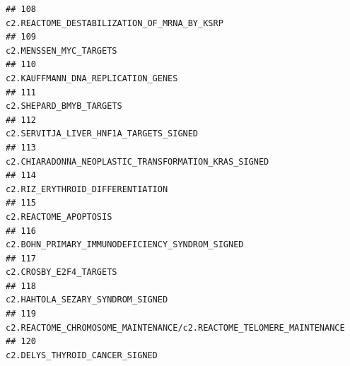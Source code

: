 \documentclass{article}\usepackage[]{graphicx}\usepackage[]{color}
\makeatletter
\newenvironment{kframe}{%
 \def\at@end@of@kframe{}%
 \ifinner\ifhmode%
  \def\at@end@of@kframe{\end{minipage}}%
  \begin{minipage}{\columnwidth}%
 \fi\fi%
 \def\FrameCommand##1{\hskip\@totalleftmargin \hskip-\fboxsep
 \colorbox{shadecolor}{##1}\hskip-\fboxsep
     \hskip-\linewidth \hskip-\@totalleftmargin \hskip\columnwidth}%
 \MakeFramed {\advance\hsize-\width
   \@totalleftmargin\z@ \linewidth\hsize
   \@setminipage}}%
 {\par\unskip\endMakeFramed%
 \at@end@of@kframe}
\newenvironment{knitrout}{}{} %
\makeatother
\begin{document}
\begin{knitrout}
\begin{kframe}
\begin{verbatim}
## 108                                                                                                                                                                      c2.REACTOME_DESTABILIZATION_OF_MRNA_BY_KSRP
## 109                                                                                                                                                                                           c2.MENSSEN_MYC_TARGETS
## 110                                                                                                                                                                               c2.KAUFFMANN_DNA_REPLICATION_GENES
## 111                                                                                                                                                                                          c2.SHEPARD_BMYB_TARGETS
## 112                                                                                                                                                                           c2.SERVITJA_LIVER_HNF1A_TARGETS_SIGNED
## 113                                                                                                                                                             c2.CHIARADONNA_NEOPLASTIC_TRANSFORMATION_KRAS_SIGNED
## 114                                                                                                                                                                                 c2.RIZ_ERYTHROID_DIFFERENTIATION
## 115                                                                                                                                                                                            c2.REACTOME_APOPTOSIS
## 116                                                                                                                                                                  c2.BOHN_PRIMARY_IMMUNODEFICIENCY_SYNDROM_SIGNED
## 117                                                                                                                                                                                           c2.CROSBY_E2F4_TARGETS
## 118                                                                                                                                                                                 c2.HAHTOLA_SEZARY_SYNDROM_SIGNED
## 119                                                                                                                                              c2.REACTOME_CHROMOSOME_MAINTENANCE/c2.REACTOME_TELOMERE_MAINTENANCE
## 120                                                                                                                                                                                   c2.DELYS_THYROID_CANCER_SIGNED

\end{verbatim}
\end{kframe}
\end{knitrout}
\end{document}
